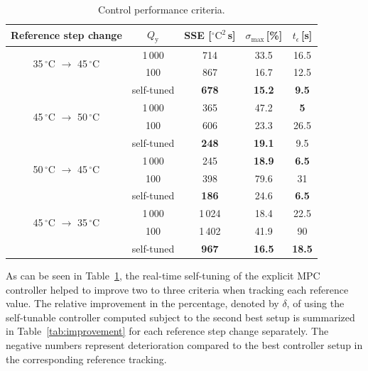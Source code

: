 \documentclass[preprint,12pt]{elsarticle}
\begin{document}
\begin{table}[h!]
	\begin{center}
		\caption{Control performance criteria.}
		\label{tab:control_performance}
		\begin{tabular}{c|c|c|c|c} 
			Reference step change & $Q_\mathrm{y}$ & SSE [$^{\circ}\mathrm{C}^2$\,s] & $\sigma_{\mathrm{max}}$\,[\%] & $t_{\epsilon}$\,[s]  \\
			\hline
			\multirow{2}{*}{ 35\,$^{\circ}$C $\rightarrow$ 45\,$^{\circ}$C } & 1\,000 & 714 & 33.5 & 16.5 \\
			& 100 & 867 & 16.7 & 12.5 \\ 
			& self-tuned & \textbf{678} & \textbf{15.2} & \textbf{9.5}  \\ 
			\hline
			\multirow{2}{*}{ 45\,$^{\circ}$C $\rightarrow$ 50\,$^{\circ}$C } & 1\,000 & 365 & 47.2 & \textbf{5} \\
			& 100 & 606 & 23.3 & 26.5  \\ 
			& self-tuned & \textbf{248} & \textbf{19.1} & 9.5  \\ 
			\hline
			\multirow{2}{*}{ 50\,$^{\circ}$C $\rightarrow$ 45\,$^{\circ}$C } & 1\,000 & 245 & \textbf{18.9} & \textbf{6.5}  \\
			& 100 & 398 & 79.6 & 31  \\ 
			& self-tuned & \textbf{186} & 24.6 & \textbf{6.5}  \\ 
			\hline
			\multirow{2}{*}{ 45\,$^{\circ}$C $\rightarrow$ 35\,$^{\circ}$C } & 1\,000 & 1\,024 & 18.4 & 22.5  \\
			& 100 & 1\,402 & 41.9 & 90  \\ 
			& self-tuned & \textbf{967} & \textbf{16.5} & \textbf{18.5}   
		\end{tabular}
	\end{center}
\end{table}

As can be seen in Table~\ref{tab:control_performance}, the real-time self-tuning of the explicit MPC controller helped to improve two to three criteria when tracking each reference value. 	
The relative improvement in the percentage, denoted by $\delta$, of using the self-tunable controller computed subject to the second best setup is summarized in Table~\ref{tab:improvement} for each reference step change separately. The negative numbers represent deterioration compared to the best controller setup in the corresponding reference tracking. 
\end{document}
